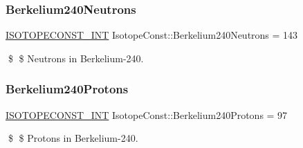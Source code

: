 \subsubsection{\texorpdfstring{Berkelium240\+Neutrons}{Berkelium240Neutrons}}
{\footnotesize\ttfamily \mbox{\hyperlink{group___isotope_const-_macros_ga5f18360b3e99483a35c32d789e62621c}{I\+S\+O\+T\+O\+P\+E\+C\+O\+N\+S\+T\+\_\+\+I\+NT}} Isotope\+Const\+::\+Berkelium240\+Neutrons = 143}

\$ \$ Neutrons in Berkelium-\/240. \mbox{\label{group___isotope_const-_berkelium-_bk240_gaa2ab5c2afed7594ad487524f3aed7b6f}} 
\subsubsection{\texorpdfstring{Berkelium240\+Protons}{Berkelium240Protons}}
{\footnotesize\ttfamily \mbox{\hyperlink{group___isotope_const-_macros_ga5f18360b3e99483a35c32d789e62621c}{I\+S\+O\+T\+O\+P\+E\+C\+O\+N\+S\+T\+\_\+\+I\+NT}} Isotope\+Const\+::\+Berkelium240\+Protons = 97}

\$ \$ Protons in Berkelium-\/240. 